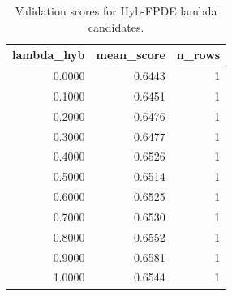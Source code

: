 \begin{table}[t]
\caption{Validation scores for Hyb-FPDE lambda candidates.}
\label{tab:lambda_distribution_computed}
\centering
\begin{tabular}{rrr}
\toprule
lambda\_hyb & mean\_score & n\_rows \\
\midrule
0.0000 & 0.6443 & 1 \\
0.1000 & 0.6451 & 1 \\
0.2000 & 0.6476 & 1 \\
0.3000 & 0.6477 & 1 \\
0.4000 & 0.6526 & 1 \\
0.5000 & 0.6514 & 1 \\
0.6000 & 0.6525 & 1 \\
0.7000 & 0.6530 & 1 \\
0.8000 & 0.6552 & 1 \\
0.9000 & 0.6581 & 1 \\
1.0000 & 0.6544 & 1 \\
\bottomrule
\end{tabular}

\end{table}
